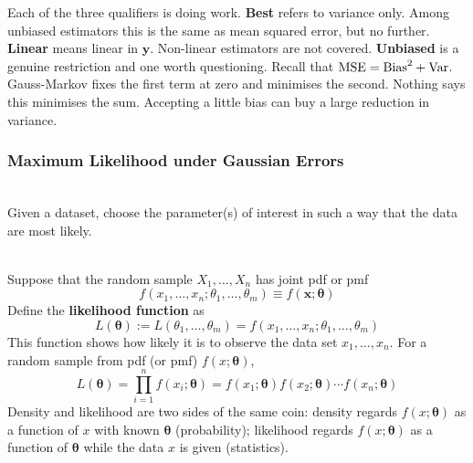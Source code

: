 Each of the three qualifiers is doing work. \textbf{Best} refers to variance only. Among unbiased estimators this is the same as mean squared error, but no further. \textbf{Linear} means linear in $\mathbf{y}$. Non-linear estimators are not covered. \textbf{Unbiased} is a genuine restriction and one worth questioning. Recall that $\text{MSE} = \text{Bias}^2 + \operatorname{Var}$. Gauss-Markov fixes the first term at zero and minimises the second. Nothing says this minimises the sum. Accepting a little bias can buy a large reduction in variance.

\subsubsection{Maximum Likelihood under Gaussian Errors}

\begin{definition}\leavevmode\\
    Given a dataset, choose the parameter(s) of interest in such a way that the data are most likely.
\end{definition}

\begin{definition} \leavevmode\\
    Suppose that the random sample $X_1,\dots,X_n$ has joint pdf or pmf
    \begin{equation*}
        f(x_1,\dots,x_n;\theta_1,\dots,\theta_m) \equiv f(\mathbf{x};\bm\theta)
    \end{equation*}
    Define the \textbf{likelihood function} as
    \begin{equation*}
        L(\bm\theta) := L(\theta_1,\dots,\theta_m) = f(x_1,\dots,x_n;\theta_1,\dots,\theta_m)
    \end{equation*}
    This function shows how likely it is to observe the data set $x_1,\dots,x_n$. For a random sample from pdf (or pmf) $f(x;\bm\theta)$,
    \begin{equation*}
        L(\bm\theta) = \prod_{i=1}^n f(x_i;\bm\theta) = f(x_1;\bm\theta)f(x_2;\bm\theta)\cdots f(x_n;\bm\theta)
    \end{equation*}
    Density and likelihood are two sides of the same coin: density regards $f(x;\bm\theta)$ as a function of $x$ with known $\bm\theta$ (probability); likelihood regards $f(x;\bm\theta)$ as a function of $\bm\theta$ while the data $x$ is given (statistics).
\end{definition}

